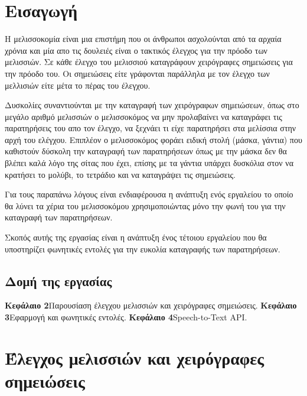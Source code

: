 \documentclass[oneside, 12pt]{book}
\begin{document}
\chapter{Εισαγωγή}\label{ch:εισαγωγή}
\leftmark\rightmark
Η μελισσοκομία είναι μια επιστήμη που οι άνθρωποι ασχολούνται από τα αρχαία χρόνια και μία απο τις
δουλειές είναι ο τακτικός έλεγχος για την πρόοδο των μελισσιών.
Σε κάθε έλεγχο του μελισσιού καταγράφουν χειρόγραφες σημειώσεις για την πρόοδο του.
Οι σημειώσεις είτε γράφονται παράλληλα με τον έλεγχο των μελλισιών είτε μέτα το πέρας του έλεγχου. \par
Δυσκολίες συναντιούνται με την καταγραφή των χειρόγραφων σημειώσεων, όπως στο μεγάλο αριθμό μελισσιών
ο μελισσοκόμος να μην προλαβαίνει να καταγράφει τις παρατηρήσεις του απο τον έλεγχο, να ξεχνάει τι
είχε παρατηρήσει στα μελίσσια στην αρχή του ελέγχου.
Επιπλέον ο μελισσοκόμος φοράει ειδική στολή (μάσκα, γάντια) που καθιστούν δύσκολη την καταγραφή των
παρατηρήσεων όπως με την μάσκα δεν θα βλέπει καλά λόγο της σίτας που έχει, επίσης με τα γάντια
υπάρχει δυσκόλια στον να κρατήσει το μολύβι, το τετράδιο και να καταγράψει τις σημειώσεις. \par
Για τους παραπάνω λόγους είναι ενδιαφέρουσα η ανάπτυξη ενός εργαλείου το οποίο θα λύνει τα χέρια του
μελισσοκόμου χρησιμοποιώντας μόνο την φωνή του για την καταγραφή των παρατηρήσεων. \par
Σκοπός αυτής της εργασίας είναι η ανάπτυξη ένος τέτοιου εργαλείου που θα υποστηρίζει φωνητικές
εντολές για την ευκολία καταγραφής των παρατηρήσεων.

\section{Δομή της εργασίας}\label{sec:δομή-της-εργασίας}
\noindent
\textbf{Κεφάλαιο 2}\quad Παρουσίαση έλεγχου μελισσιών και χειρόγραφες σημειώσεις.\newline
\textbf{Κεφάλαιο 3}\quad Εφαρμογή και φωνητικές εντολές.\newline
\textbf{Κεφάλαιο 4}\quad Speech-to-Text API.

\chapter{Έλεγχος μελισσιών και χειρόγραφες σημειώσεις}
\label{ch:έλεγχος-μελισσιών-και-χειρόγραφες-σημειώσεις}
\end{document}
